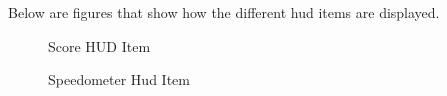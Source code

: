 \documentclass[10pt]{report}
\begin{document}




Below are figures that show how the different hud items are displayed.
\begin{figure}[H]
    \begin{minipage}{.5\textwidth}
        \centering
        \caption{Score HUD Item}
    \end{minipage}
    \begin{minipage}{.5\textwidth}
        \centering
        \caption{Speedometer Hud Item}
    \end{minipage}
\end{figure}
\end{document}
